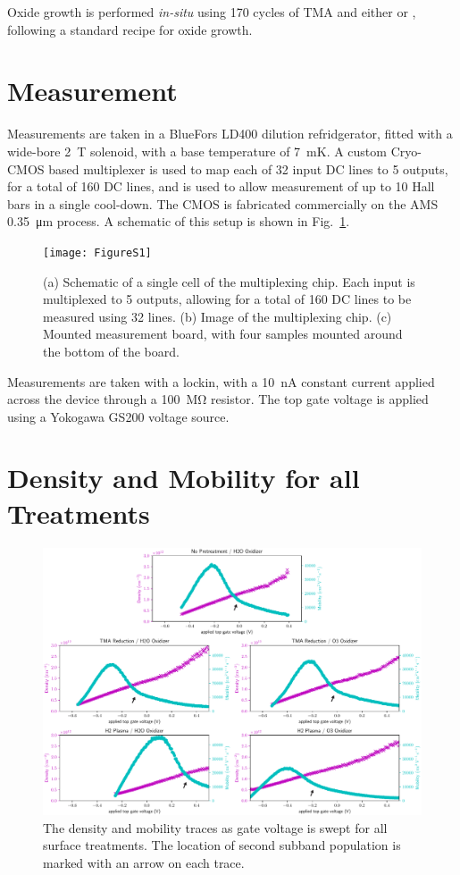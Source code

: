 Oxide growth is performed \emph{in-situ} using 170 cycles of TMA and either  or , following a standard recipe for oxide growth.

\section{Measurement}
\label{sec:surf_mulberry}
Measurements are taken in a BlueFors LD400 dilution refridgerator, fitted with a wide-bore \SI{2}{\tesla} solenoid, with a base temperature of \SI{7}{\milli\kelvin}. A custom Cryo-CMOS based multiplexer is used to map each of 32 input DC lines to 5 outputs, for a total of 160 DC lines, and is used to allow measurement of up to 10 Hall bars in a single cool-down. The CMOS is fabricated commercially on the AMS \SI{0.35}{\micro\meter} process. A schematic of this setup is shown in Fig.~\ref{fig:surf_cmos}.

\begin{figure}[h]
    \texttt{[image: FigureS1]}
    \caption[Measurement multiplexing setup]{(a) Schematic of a single cell of the multiplexing chip. Each input is multiplexed to 5 outputs, allowing for a total of 160 DC lines to be measured using 32 lines. (b) Image of the multiplexing chip. (c) Mounted measurement board, with four samples mounted around the bottom of the board.}
    \label{fig:surf_cmos}
\end{figure}

Measurements are taken with a lockin, with a \SI{10}{\nano\ampere} constant current applied across the device through a \SI{100}{\mega\ohm} resistor. The top gate voltage is applied using a Yokogawa GS200 voltage source.

\clearpage
\section{Density and Mobility for all Treatments}
\label{sec:all_treat}
\begin{figure}[h]
    \includegraphics[width=\linewidth]{FigureS3}
    \caption[Density/Mobility for all Treatments]{The density and mobility traces as gate voltage is swept for all surface treatments. The location of second subband population is marked with an arrow on each trace.}
    \label{fig:surf_allt}
\end{figure}

